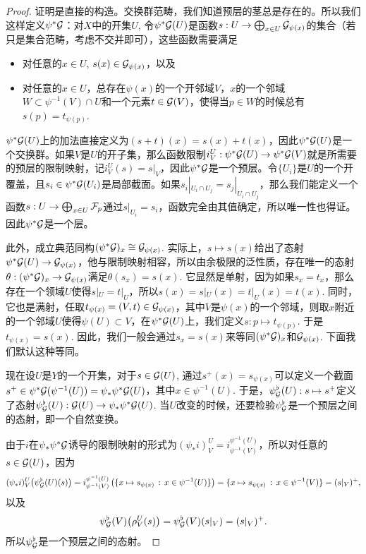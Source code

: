 \begin{proof} 
	证明是直接的构造。交换群范畴，我们知道预层的茎总是存在的。所以我们这样定义$\psi^*\mathcal{G}$：对$X$中的开集$U$, 令$\psi^*\mathcal{G}(U)$是函数$s:U\to \bigoplus_{x\in U}\mathcal{G}_{\psi(x)}$的集合（若只是集合范畴，考虑不交并即可），这些函数需要满足
	\begin{itemize}
		\item 对任意的$x\in U$, $s(x)\in \mathcal{G}_{\psi(x)}$，以及

		\item 对任意的$x\in U$，总存在$\psi(x)$的一个开邻域$V$，$x$的一个邻域$W\subset \psi^{-1}(V)\cap U$和一个元素$t\in \mathcal{G}(V)$，使得当$p\in W$的时候总有$s(p)=t_{\psi(p)}$.
	\end{itemize}

	$\psi^*\mathcal{G}(U)$上的加法直接定义为$(s+t)(x)=s(x)+t(x)$，因此$\psi^*\mathcal{G}(U)$是一个交换群。如果$V$是$U$的开子集，那么函数限制$i^U_V:\psi^*\mathcal{G}(U)\to \psi^*\mathcal{G}(V)$就是所需要的预层的限制映射，记$i^U_V(s)=s|_V$，因此$\psi^*\mathcal{G}$是一个预层。令$\{U_i\}$是$U$的一个开覆盖，且$s_i\in \psi^*\mathcal{G}(U_i)$是局部截面。如果$s_i|_{U_i\cap U_j}=s_j|_{U_i\cap U_j}$，那么我们能定义一个函数$s:U\to \bigoplus_{x\in U}\mathcal{F}_p$通过$s|_{U_i}=s_i$，函数完全由其值确定，所以唯一性也得证。因此$\psi^*\mathcal{G}$是一个层。

	此外，成立典范同构$(\psi^*\mathcal{G})_x\cong \mathcal{G}_{\psi(x)}$. 实际上，$s\mapsto s(x)$给出了态射$\psi^*\mathcal{G}(U)\to \mathcal{G}_{\psi(x)}$，他与限制映射相容，所以由余极限的泛性质，存在唯一的态射$\theta:(\psi^*\mathcal{G})_x\to \mathcal{G}_{\psi(x)}$满足$\theta(s_x)=s(x)$. 它显然是单射，因为如果$s_x=t_x$，那么存在一个领域$U$使得$s|_U=t|_U$，所以$s(x)=s|_U(x)=t|_U(x)=t(x)$. 同时，它也是满射，任取$t_{\psi(x)}=(V,t)\in \mathcal{G}_{\psi(x)}$，其中$V$是$\psi(x)$的一个邻域，则取$x$附近的一个邻域$U$使得$\psi(U)\subset V$，在$\psi^*\mathcal{G}(U)$上，我们定义$s:p\mapsto t_{\psi(p)}$. 于是$t_{\psi(x)}=s(x)$. 因此，我们一般会通过$s_x=s(x)$来等同$(\psi^*\mathcal{G})_x$和$\mathcal{G}_{\psi(x)}$. 下面我们默认这种等同。

	现在设$U$是$Y$的一个开集，对于$s\in \mathcal{G}(U)$, 通过$s^+(x)=s_{\psi(x)}$可以定义一个截面$s^+\in \psi^*\mathcal{G}(\psi^{-1}(U))=\psi_*\psi^*\mathcal{G}(U)$，其中$x\in \psi^{-1}(U)$. 于是，$\psi^\flat_{\mathcal{G}}(U):s\mapsto s^+$定义了态射$\psi^\flat_{\mathcal{G}}(U):\mathcal{G}(U)\to \psi_*\psi^*\mathcal{G}(U)$. 当$U$改变的时候，还要检验$\psi^\flat_{\mathcal{G}}$是一个预层之间的态射，即一个自然变换。

	由于$i$在$\psi_*\psi^*\mathcal{G}$诱导的限制映射的形式为$(\psi_* i)^U_V=i^{\psi^{-1}(U)}_{\psi^{-1}(V)}$，所以对任意的$s\in \mathcal{G}(U)$，因为
	\[
		(\psi_* i)^U_V\bigl(\psi^\flat_{\mathcal{G}}(U)(s)\bigr)=i^{\psi^{-1}(U)}_{\psi^{-1}(V)}\left(\{x\mapsto s_{\psi(x)}\,:\, x\in \psi^{-1}(U)\}\right)=\{x\mapsto s_{\psi(x)}\,:\, x\in \psi^{-1}(V)\}=(s|_V)^+,
	\]
	以及
	\[
		\psi^\flat_{\mathcal{G}}(V)\bigl(\rho^U_V(s)\bigr)=\psi^\flat_{\mathcal{G}}(V)(s|_V)=(s|_V)^+.
	\]
	所以$\psi^\flat_{\mathcal{G}}$是一个预层之间的态射。


\end{proof}
